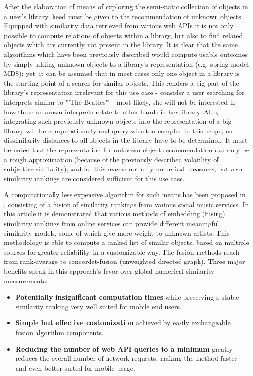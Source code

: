 After the elaboration of means of exploring the semi-static collection of objects in a user's library, heed must be given to the recommendation of unknown objects. Equipped with similarity data retrieved from various web APIs it is not only possible to compute relations of objects within a library, but also to find related objects which are currently not present in the library. It is clear that the same algorithms which have been previously described would compute usable outcomes by simply adding unknown objects to a library's representation (e.g. spring model MDS); yet, it can be assumed that in most cases only one object in a library is the starting point of a search for similar objects. This renders a big part of the library's representation irrelevant for this use case - consider a user searching for interprets similar to "'The Beatles"' - most likely, she will not be interested in how these unknown interprets relate to other bands in her library. Also, integrating such previously unknown objects into the representation of a big library will be computationally and query-wise too complex in this scope, as dissimilarity distances to all objects in the library have to be determined. It must be noted that the representation for unknown object recommendation can only be a rough approximation (because of the previously described volatility of subjective similarity), and for this reason not only numerical measures, but also similarity rankings are considered sufficient for this use case.

A computationally less expensive algorithm for such means has been proposed in \cite{Marshall:2010}, consisting of a fusion of similarity rankings from various social music services. In this article it is demonstrated that various methods of embedding (fusing) similarity rankings from online services can provide different meaningful similarity models, some of which give more weight to unknown artists. This methodology is able to compute a ranked list of similar objects, based on multiple sources for greater reliability, in a customizable way. The fusion methods reach from rank-average to concordet-fusion (unweighted directed graph). Three major benefits speak in this approach's favor over global numerical similarity measurements:

\begin{itemize}
	\item \textbf{Potentially insignificant computation times} while preserving a stable similarity ranking very well suited for mobile end users.
	\item \textbf{Simple but effective customization} achieved by easily exchangeable fusion algorithm components.
	\item \textbf{Reducing the number of web API queries to a minimum} greatly reduces the overall number of network requests, making the method faster and even better suited for mobile usage.
\end{itemize}

